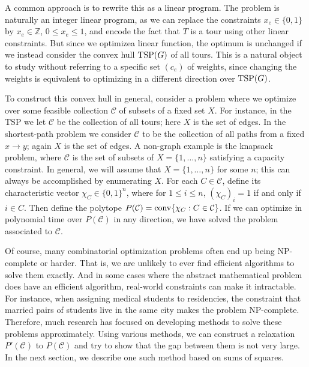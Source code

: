 A common approach is to rewrite this as a linear program. 
The problem is naturally an integer linear program, as we can replace the constraints $x_e \in \{0,1\}$ by $x_e \in \mathbb{Z}$, $0 \le x_e \le 1$, and encode the fact that $T$ is a tour using other linear constraints.
But since we optimizea linear function, the optimum is unchanged if we instead consider the convex hull $\textup{TSP}(G)$ of all tours.
This is a natural object to study without referring to a specific set $(c_e)$ of weights, since changing the weights is equivalent to optimizing in a different direction over $\textup{TSP}(G)$.

To construct this convex hull in general, consider a problem where we optimize over some feasible collection $\mathcal{C}$ of subsets of a fixed set $X$.
For instance, in the TSP we let $\mathcal{C}$ be the collection of all tours; here $X$ is the set of edges.
In the shortest-path problem we consider $\mathcal{C}$ to be the collection of all paths from a fixed $x \to y$; again $X$ is the set of edges.
A non-graph example is the knapsack problem, where $\mathcal{C}$ is the set of subsets of $X = \{1, \ldots, n\}$ satisfying a capacity constraint.
In general, we will assume that $X = \{1, \ldots, n\}$ for some $n$; this can always be accomplished by enumerating $X$.
For each $C \in \mathcal{C}$, define its characteristic vector $\chi_C \in \{0,1\}^n$, where for $1 \le i \le n$, $(\chi_C)_i = 1$ if and only if $i \in C$.
Then define the polytope $P(\mathcal{C}) = \hbox{conv} \{\chi_C: C \in \mathcal{C}\}$.
If we can optimize in polynomial time over $P(\mathcal{C})$ in any direction, we have solved the problem associated to $\mathcal{C}$.

Of course, many combinatorial optimization problems often end up being NP-complete or harder. 
That is, we are unlikely to ever find efficient algorithms to solve them exactly.
And in some cases where the abstract mathematical problem does have an efficient algorithm, real-world constraints can make it intractable. 
For instance, when assigning medical students to residencies, the constraint that married pairs of students live in the same city makes the problem NP-complete.
Therefore, much research has focused on developing methods to solve these problems approximately. 
Using various methods, we can construct a relaxation $P'(\mathcal{C})$ to $ P(\mathcal{C})$ and try to show that the gap between them is not very large.
In the next section, we describe one such method based on sums of squares.

